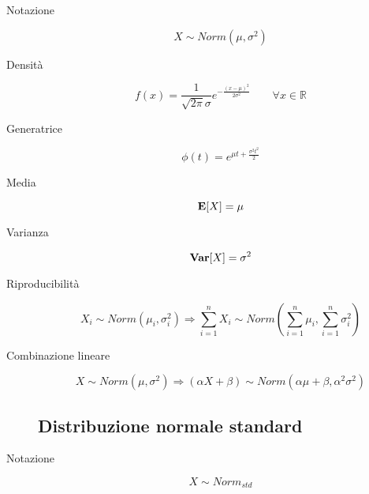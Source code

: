 \begin{description}
	
	\item [Notazione]
		\begin{equation}
		X \sim Norm(\mu,\sigma^{2})
		\end{equation}
	
	\item [Densità]
		\begin{equation}
		f(x) = \frac{1}{\sqrt{2\pi}\sigma}e^{-\frac{(x-\mu)^{2}}{2\sigma^{2}}} \qquad\forall x\in \mathbb{R}
		\end{equation}
	
	\item [Generatrice]
		\begin{equation}
		\phi(t) = e^{\mu t + \frac{\sigma^{2}t^{2}}{2}}
		\end{equation}
	
	\item [Media]
		\begin{equation}
		\mathbf{E}[X] = \mu
		\end{equation}
	
	\item [Varianza]
		\begin{equation}
		\mathbf{Var}[X] = \sigma^{2}
		\end{equation}
		
	\item [Riproducibilità]
		\begin{equation}
		X_{i} \sim Norm(\mu_{i},\sigma_{i}^{2}) \Rightarrow \sum_{i=1}^{n}X_{i} \sim Norm(\sum_{i=1}^{n}\mu_{i},\sum_{i=1}^{n}\sigma_{i}^{2})
		\end{equation}	
		
	\item [Combinazione lineare]
		\begin{equation}
		X \sim Norm(\mu,\sigma^{2}) \Rightarrow (\alpha X + \beta) \sim Norm(\alpha\mu + \beta,\alpha^{2}\sigma^{2}) 
		\end{equation}
		

\subsection{Distribuzione normale standard}

	\item [Notazione]
		\begin{equation}
		X \sim Norm_{std}
		\end{equation}
		

\end{description}
